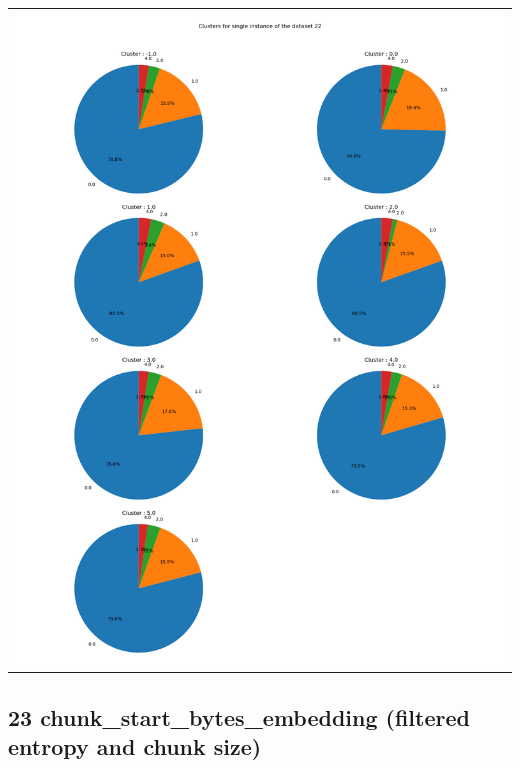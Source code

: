 \begin{longtable}{|c|c|c|c|c|}
\multicolumn{5}{|c|}{\includegraphics[width=0.8\linewidth]{img/annexes/22/clustering_pie_charts/single instance.png}} \\
\end{longtable}


\subsection{23 chunk\_start\_bytes\_embedding (filtered entropy and chunk size)}

